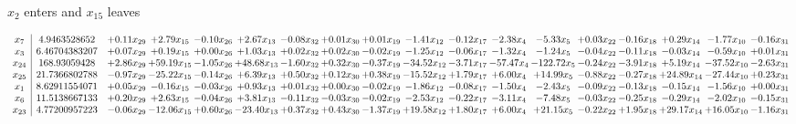 \documentclass[9pt]{article}
\begin{document}
 $ x_{2} $ enters and $ x_{15} $ leaves 

 \[\begin{array}{c| c c@{\hskip 2pt} c@{\hskip 2pt} c@{\hskip 2pt} c@{\hskip 2pt} c@{\hskip 2pt} c@{\hskip 2pt} c@{\hskip 2pt} c@{\hskip 2pt} c@{\hskip 2pt} c@{\hskip 2pt} c@{\hskip 2pt} c@{\hskip 2pt} c@{\hskip 2pt} c@{\hskip 2pt} c@{\hskip 2pt} c@{\hskip 2pt} }
 x_{7}   &  4.9463528652 & +  0.11 x_{29} & +  2.79 x_{15} & -0.10 x_{26} & +  2.67 x_{13} & -0.08 x_{32} & +  0.01 x_{30} & +  0.01 x_{19} & -1.41 x_{12} & -0.12 x_{17} & -2.38 x_{4} & -5.33 x_{5} & +  0.03 x_{22} & -0.16 x_{18} & +  0.29 x_{14} & -1.77 x_{10} & -0.16 x_{31}\\
 x_{3}   &  6.46704383207 & +  0.07 x_{29} & +  0.19 x_{15} & +  0.00 x_{26} & +  1.03 x_{13} & +  0.02 x_{32} & +  0.02 x_{30} & -0.02 x_{19} & -1.25 x_{12} & -0.06 x_{17} & -1.32 x_{4} & -1.24 x_{5} & -0.04 x_{22} & -0.11 x_{18} & -0.03 x_{14} & -0.59 x_{10} & +  0.01 x_{31}\\
 x_{24}   &  168.93059428 & +  2.86 x_{29} & + 59.19 x_{15} & -1.05 x_{26} & + 48.68 x_{13} & -1.60 x_{32} & +  0.32 x_{30} & -0.37 x_{19} & -34.52 x_{12} & -3.71 x_{17} & -57.47 x_{4} & -122.72 x_{5} & -0.24 x_{22} & -3.91 x_{18} & +  5.19 x_{14} & -37.52 x_{10} & -2.63 x_{31}\\
 x_{25}   &  21.7366802788 & -0.97 x_{29} & -25.22 x_{15} & -0.14 x_{26} & +  6.39 x_{13} & +  0.50 x_{32} & +  0.12 x_{30} & +  0.38 x_{19} & -15.52 x_{12} & +  1.79 x_{17} & +  6.00 x_{4} & + 14.99 x_{5} & -0.88 x_{22} & -0.27 x_{18} & + 24.89 x_{14} & -27.44 x_{10} & +  0.23 x_{31}\\
 x_{1}   &  8.62911554071 & +  0.05 x_{29} & -0.16 x_{15} & -0.03 x_{26} & +  0.93 x_{13} & +  0.01 x_{32} & +  0.00 x_{30} & -0.02 x_{19} & -1.86 x_{12} & -0.08 x_{17} & -1.50 x_{4} & -2.43 x_{5} & -0.09 x_{22} & -0.13 x_{18} & -0.15 x_{14} & -1.56 x_{10} & +  0.00 x_{31}\\
 x_{6}   &  11.5138667133 & +  0.20 x_{29} & +  2.63 x_{15} & -0.04 x_{26} & +  3.81 x_{13} & -0.11 x_{32} & -0.03 x_{30} & -0.02 x_{19} & -2.53 x_{12} & -0.22 x_{17} & -3.11 x_{4} & -7.48 x_{5} & -0.03 x_{22} & -0.25 x_{18} & -0.29 x_{14} & -2.02 x_{10} & -0.15 x_{31}\\
 x_{23}   &  4.77200957223 & -0.06 x_{29} & -12.06 x_{15} & +  0.60 x_{26} & -23.40 x_{13} & +  0.37 x_{32} & +  0.43 x_{30} & -1.37 x_{19} & + 19.58 x_{12} & +  1.80 x_{17} & +  6.00 x_{4} & + 21.15 x_{5} & -0.22 x_{22} & +  1.95 x_{18} & + 29.17 x_{14} & + 16.05 x_{10} & -1.16 x_{31}\\

\end{array}\]
\end{document}
